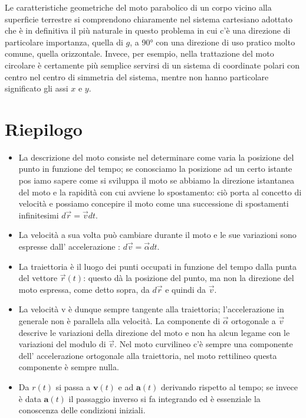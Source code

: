 \documentclass[class=book, crop=false, oneside, 12pt]{standalone}
\begin{document}
Le caratteristiche geometriche del moto parabolico di un corpo vicino alla superficie terrestre si comprendono chiaramente nel sistema cartesiano adottato che è in definitiva il più naturale in questo problema in cui c'è una direzione di particolare importanza, 
quella di \(g\), a 90° con una direzione di uso pratico molto comune, quella orizzontale. 
Invece, per esempio, nella trattazione del moto circolare è certamente più semplice servirsi di un sistema di coordinate polari con centro nel centro di simmetria del sistema, mentre non hanno particolare significato gli assi \(x\) e \(y\).

\section{Riepilogo}

\begin{itemize}
  \item La descrizione del moto consiste nel determinare come varia la posizione del punto in funzione del tempo; se conosciamo la posizione ad un certo istante pos iamo sapere come si sviluppa il moto se abbiamo la direzione istantanea del moto e la rapidità con cui avviene lo spostamento: ciò porta al concetto di velocità e possiamo concepire il moto come una successione di spostamenti infinitesimi \(d \overrightarrow{r}= \overrightarrow{v} dt\).
  \item La velocità a sua volta può cambiare durante il moto e le sue variazioni sono espresse dall' accelerazione : \(d \overrightarrow{v} = \overrightarrow{\alpha} d t\).
  \item La traiettoria è il luogo dei punti occupati in funzione del tempo dalla punta del vettore \(\overrightarrow{r}(t)\): questo dà la posizione del punto, ma non la direzione del moto espressa, come detto sopra, da \(d \overrightarrow{r}\) e quindi da \(\overrightarrow{v}\). 
  \item La velocità v è dunque sempre tangente alla traiettoria; l'accelerazione in generale non è parallela alla velocità. La componente di \(\overrightarrow{\alpha}\) ortogonale a \(\overrightarrow{v}\) descrive le variazioni della direzione del moto e non ha alcun legame con le variazioni del modulo di \(\overrightarrow{v}\). Nel moto curvilineo c'è sempre una componente dell' accelerazione ortogonale alla traiettoria, nel moto rettilineo questa componente è sempre nulla. 
  \item Da \(r(t)\) si passa a \(\boldsymbol{v}(t)\) e ad \(\boldsymbol{a}(t)\) derivando rispetto al tempo; se invece è data \(\boldsymbol{a}(t)\) il passaggio inverso si fa integrando ed è essenziale la conoscenza delle condizioni iniziali. 

\end{itemize}
\end{document}
